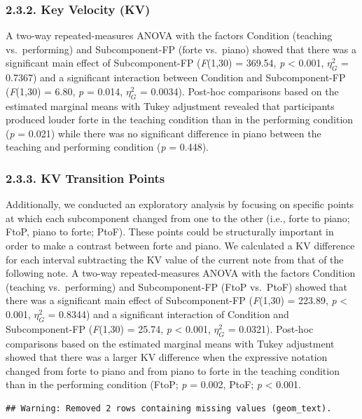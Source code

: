 \documentclass[
  english,
  man,floatsintext]{apa6}
\begin{document}
\hypertarget{key-velocity-kv-1}{%
\subsubsection{2.3.2. Key Velocity (KV)}\label{key-velocity-kv-1}}

A two-way repeated-measures ANOVA with the factors Condition (teaching vs.~performing) and Subcomponent-FP (forte vs.~piano) showed that there was a significant main effect of Subcomponent-FP (\emph{F}(1,30) = 369.54, \emph{p} \textless{} 0.001, \(\eta_G^2\) = 0.7367) and a significant interaction between Condition and Subcomponent-FP (\emph{F}(1,30) = 6.80, \emph{p} = 0.014, \(\eta_G^2\) = 0.0034). Post-hoc comparisons based on the estimated marginal means with Tukey adjustment revealed that participants produced louder forte in the teaching condition than in the performing condition (\emph{p} = 0.021) while there was no significant difference in piano between the teaching and performing condition (\emph{p} = 0.448).

\hypertarget{kv-transition-points}{%
\subsubsection{2.3.3. KV Transition Points}\label{kv-transition-points}}

Additionally, we conducted an exploratory analysis by focusing on specific points at which each subcomponent changed from one to the other (i.e., forte to piano; FtoP, piano to forte; PtoF). These points could be structurally important in order to make a contrast between forte and piano. We calculated a KV difference for each interval subtracting the KV value of the current note from that of the following note. A two-way repeated-measures ANOVA with the factors Condition (teaching vs.~performing) and Subcomponent-FP (FtoP vs.~PtoF) showed that there was a significant main effect of Subcomponent-FP (\emph{F}(1,30) = 223.89, \emph{p} \textless{} 0.001, \(\eta_G^2\) = 0.8344) and a significant interaction of Condition and Subcomponent-FP (\emph{F}(1,30) = 25.74, \emph{p} \textless{} 0.001, \(\eta_G^2\) = 0.0321). Post-hoc comparisons based on the estimated marginal means with Tukey adjustment showed that there was a larger KV difference when the expressive notation changed from forte to piano and from piano to forte in the teaching condition than in the performing condition (FtoP; \emph{p} = 0.002, PtoF; \emph{p} \textless{} 0.001.

\begin{verbatim}
## Warning: Removed 2 rows containing missing values (geom_text).
\end{verbatim}
\end{document}
